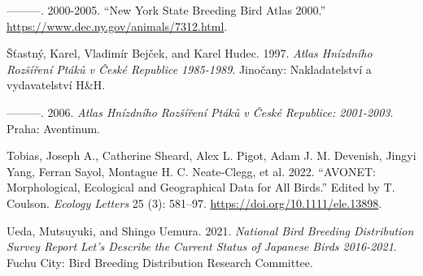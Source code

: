 \documentclass[
  letterpaper,
  DIV=11,
  numbers=noendperiod]{scrreprt}
\newlength{\cslhangindent}
\newenvironment{CSLReferences}[2] %
 {\begin{list}{}{%
  \setlength{\itemindent}{0pt}
  \setlength{\leftmargin}{0pt}
  \setlength{\parsep}{0pt}
  \ifodd #1
   \setlength{\leftmargin}{\cslhangindent}
   \setlength{\itemindent}{-1\cslhangindent}
  \fi
  \setlength{\itemsep}{#2\baselineskip}}}
 {\end{list}}
\begin{document}
\begin{CSLReferences}{1}{0}
---------. 2000-2005. {``New York State Breeding Bird Atlas 2000.''}
\url{https://www.dec.ny.gov/animals/7312.html}.

Šťastný, Karel, Vladimír Bejček, and Karel Hudec. 1997. \emph{Atlas
Hnízdního Rozšíření Ptáků v České Republice 1985-1989}. Jinočany:
Nakladatelství a vydavatelství H\&H.

---------. 2006. \emph{Atlas Hnízdního Rozšíření Ptáků v České
Republice: 2001-2003}. Praha: Aventinum.

Tobias, Joseph A., Catherine Sheard, Alex L. Pigot, Adam J. M. Devenish,
Jingyi Yang, Ferran Sayol, Montague H. C. Neate‐Clegg, et al. 2022.
{``AVONET: Morphological, Ecological and Geographical Data for All
Birds.''} Edited by T. Coulson. \emph{Ecology Letters} 25 (3): 581--97.
\url{https://doi.org/10.1111/ele.13898}.

Ueda, Mutsuyuki, and Shingo Uemura. 2021. \emph{National Bird Breeding
Distribution Survey Report Let's Describe the Current Status of Japanese
Birds 2016-2021}. Fuchu City: Bird Breeding Distribution Research
Committee.

\end{CSLReferences}
\end{document}
